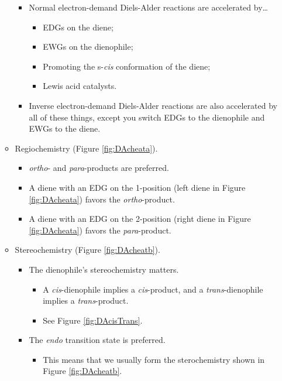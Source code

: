 \documentclass[../notes.tex]{subfiles}
\begin{document}
\begin{itemize}
\begin{itemize}
        \begin{itemize}
            \item Normal electron-demand Diels-Alder reactions are accelerated by\dots
            \begin{itemize}
                \item EDGs on the diene;
                \item EWGs on the dienophile;
                \item Promoting the s-\emph{cis} conformation of the diene;
                \item Lewis acid catalysts.
            \end{itemize}
            \item Inverse electron-demand Diels-Alder reactions are also accelerated by all of these things, except you switch EDGs to the dienophile and EWGs to the diene.
        \end{itemize}
        \item Regiochemistry (Figure \ref{fig:DAcheata}).
        \begin{itemize}
            \item \emph{ortho}- and \emph{para}-products are preferred.
            \item A diene with an EDG on the 1-position (left diene in Figure \ref{fig:DAcheata}) favors the \emph{ortho}-product.
            \item A diene with an EDG on the 2-position (right diene in Figure \ref{fig:DAcheata}) favors the \emph{para}-product.
        \end{itemize}
        \item Stereochemistry (Figure \ref{fig:DAcheatb}).
        \begin{itemize}
            \item The dienophile's stereochemistry matters.
            \begin{itemize}
                \item A \emph{cis}-dienophile implies a \emph{cis}-product, and a \emph{trans}-dienophile implies a \emph{trans}-product.
                \item See Figure \ref{fig:DAcisTrans}.
            \end{itemize}
            \item The \emph{endo} transition state is preferred.
            \begin{itemize}
                \item This means that we usually form the sterochemistry shown in Figure \ref{fig:DAcheatb}.

\end{itemize}
\end{itemize}
\end{itemize}
\end{itemize}
\end{document}
